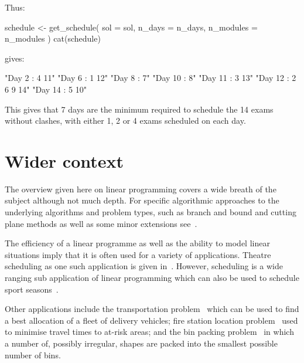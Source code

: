 Thus:

\begin{Rin-no-test}
schedule <- get_schedule(
  sol = sol,
  n_days = n_days,
  n_modules = n_modules
)
cat(schedule)
\end{Rin-no-test}

gives:

\begin{Rout-no-test}

 "Day 2 : 4 11"
 "Day 6 : 1 12"
 "Day 8 : 7"
 "Day 10 : 8"
 "Day 11 : 3 13"
 "Day 12 : 2 6 9 14"
 "Day 14 : 5 10"
\end{Rout-no-test}

This gives that 7 days are the minimum required to schedule the 14 exams without
clashes, with either 1, 2 or 4 exams scheduled on each day.

\section{Wider context}\label{sec:linear_programming_wider_context}

The overview given here on linear programming covers a wide breath of the subject
although not much depth. For specific algorithmic approaches to the underlying
algorithms and problem types, such as branch and bound and cutting plane methods
as well as some minor extensions see~\cite{conforti2014integer,
sultan2014linear}.

The efficiency of a linear programme as well as the ability to model
linear situations imply that it is often used for a variety of applications.
Theatre scheduling as one such application is given
in~\cite{guerriero2011operational}.
However, scheduling is a wide ranging sub application of linear programming
which can also be used to schedule sport
seasons~\cite{duran2007scheduling}.

Other applications include the transportation problem~\cite{diaz2014survey}
which can be used to find a best allocation of a fleet of delivery vehicles;
fire station location problem~\cite{schreuder1981application} used to
minimise travel times to at-risk areas; and the bin packing
problem~\cite{hifi2010linear} in which a number of, possibly irregular,
shapes are packed into the smallest possible number of bins.
